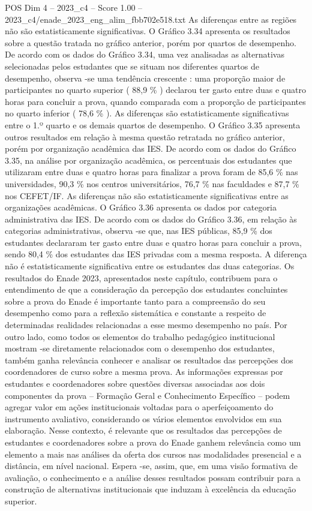 \begin{textsample}{POS Dim 4 – 2023\_c4 – Score 1.00 – 2023\_c4/enade\_2023\_eng\_alim\_fbb702e518.txt}
As diferenças entre as regiões não são estatisticamente significativas.
O Gráfico 3.34 apresenta os resultados sobre a questão tratada no gráfico anterior, porém por quartos de desempenho.
De acordo com os dados do Gráfico 3.34, uma vez analisadas as alternativas selecionadas pelos estudantes que se situam nos diferentes quartos de desempenho, observa -se uma tendência crescente : uma proporção maior de participantes no quarto superior ( 88,9 \% ) declarou ter gasto entre duas e quatro horas para concluir a prova, quando comparada com a proporção de participantes no quarto inferior ( 78,6 \% ).
As diferenças são estatisticamente significativas entre o 1.º quarto e os demais quartos de desempenho.
O Gráfico 3.35 apresenta outros resultados em relação à mesma questão retratada no gráfico anterior, porém por organização acadêmica das IES.
De acordo com os dados do Gráfico 3.35, na análise por organização acadêmica, os percentuais dos estudantes que utilizaram entre duas e quatro horas para finalizar a prova foram de 85,6 \% nas universidades, 90,3 \% nos centros universitários, 76,7 \% nas faculdades e 87,7 \% nos CEFET/IF.
As diferenças não são estatisticamente significativas entre as organizações acadêmicas.
O Gráfico 3.36 apresenta os dados por categoria administrativa das IES.
De acordo com os dados do Gráfico 3.36, em relação às categorias administrativas, observa -se que, nas IES públicas, 85,9 \% dos estudantes declararam ter gasto entre duas e quatro horas para concluir a prova, sendo 80,4 \% dos estudantes das IES privadas com a mesma resposta.
A diferença não é estatisticamente significativa entre os estudantes das duas categorias.
Os resultados do Enade 2023, apresentados neste capítulo, contribuem para o entendimento de que a consideração da percepção dos estudantes concluintes sobre a prova do Enade é importante tanto para a compreensão do seu desempenho como para a reflexão sistemática e constante a respeito de determinadas realidades relacionadas a esse mesmo desempenho no país.
Por outro lado, como todos os elementos do trabalho pedagógico institucional mostram -se diretamente relacionados com o desempenho dos estudantes, também ganha relevância conhecer e analisar os resultados das percepções dos coordenadores de curso sobre a mesma prova.
As informações expressas por estudantes e coordenadores sobre questões diversas associadas aos dois componentes da prova – Formação Geral e Conhecimento Específico – podem agregar valor em ações institucionais voltadas para o aperfeiçoamento do instrumento avaliativo, considerando os vários elementos envolvidos em sua elaboração.
Nesse contexto, é relevante que os resultados das percepções de estudantes e coordenadores sobre a prova do Enade ganhem relevância como um elemento a mais nas análises da oferta dos cursos nas modalidades presencial e a distância, em nível nacional.
Espera -se, assim, que, em uma visão formativa de avaliação, o conhecimento e a análise desses resultados possam contribuir para a construção de alternativas institucionais que induzam à excelência da educação superior.

\end{textsample}
